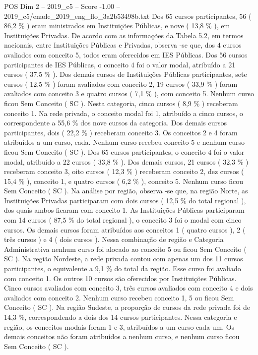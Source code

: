 \begin{textsample}{POS Dim 2 – 2019\_c5 – Score -1.00 – 2019\_c5/enade\_2019\_eng\_flo\_3a2b53498b.txt}
Dos 65 cursos participantes, 56 ( 86,2 \% ) eram ministrados em Instituições Públicas, e nove ( 13,8 \% ), em Instituições Privadas.
De acordo com as informações da Tabela 5.2, em termos nacionais, entre Instituições Públicas e Privadas, observa -se que, dos 4 cursos avaliados com conceito 5, todos eram oferecidos em IES Públicas.
Dos 56 cursos participantes de IES Públicas, o conceito 4 foi o valor modal, atribuído a 21 cursos ( 37,5 \% ).
Dos demais cursos de Instituições Públicas participantes, sete cursos ( 12,5 \% ) foram avaliados com conceito 2, 19 cursos ( 33,9 \% ) foram avaliados com conceito 3 e quatro cursos ( 7,1 \% ), com conceito 5.
Nenhum curso ficou Sem Conceito ( SC ).
Nesta categoria, cinco cursos ( 8,9 \% ) receberam conceito 1.
Na rede privada, o conceito modal foi 1, atribuído a cinco cursos, o correspondente a 55,6 \% dos nove cursos da categoria.
Dos demais cursos participantes, dois ( 22,2 \% ) receberam conceito 3.
Os conceitos 2 e 4 foram atribuídos a um curso, cada.
Nenhum curso recebeu conceito 5 e nenhum curso ficou Sem Conceito ( SC ).
Dos 65 cursos participantes, o conceito 4 foi o valor modal, atribuído a 22 cursos ( 33,8 \% ).
Dos demais cursos, 21 cursos ( 32,3 \% ) receberam conceito 3, oito cursos ( 12,3 \% ) receberam conceito 2, dez cursos ( 15,4 \% ), conceito 1, e quatro cursos ( 6,2 \% ), conceito 5.
Nenhum curso ficou Sem Conceito ( SC ).
Na análise por região, observa -se que, na região Norte, as Instituições Privadas participaram com dois cursos ( 12,5 \% do total regional ), dos quais ambos ficaram com conceito 1.
As Instituições Públicas participaram com 14 cursos ( 87,5 \% do total regional ), o conceito 3 foi o modal com cinco cursos.
Os demais cursos foram atribuídos aos conceitos 1 ( quatro cursos ), 2 ( três cursos ) e 4 ( dois cursos ).
Nessa combinação de região e Categoria Administrativa nenhum curso foi alocado ao conceito 5 ou ficou Sem Conceito ( SC ).
Na região Nordeste, a rede privada contou com apenas um dos 11 cursos participantes, o equivalente a 9,1 \% do total da região.
Esse curso foi avaliado com conceito 1.
Os outros 10 cursos são oferecidos por Instituições Públicas.
Cinco cursos avaliados com conceito 3, três cursos avaliados com conceito 4 e dois avaliados com conceito 2.
Nenhum curso recebeu conceito 1, 5 ou ficou Sem Conceito ( SC ).
Na região Sudeste, a proporção de cursos da rede privada foi de 14,3 \%, correspondendo a dois dos 14 cursos participantes.
Nessa categoria e região, os conceitos modais foram 1 e 3, atribuídos a um curso cada um.
Os demais conceitos não foram atribuídos a nenhum curso, e nenhum curso ficou Sem Conceito ( SC ).

\end{textsample}
